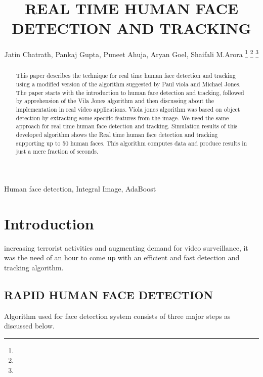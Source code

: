 \documentclass[journal]{IEEEtran}
\begin{document}
\title{REAL TIME HUMAN FACE\\DETECTION AND TRACKING}


\author{Jatin Chatrath,
        Pankaj Gupta,
        Puneet Ahuja,
        Aryan Goel,
        Shaifali M.Arora%
\thanks{}%
\thanks{}%
\thanks{}}



\maketitle

\begin{abstract}
This paper describes the technique for real time human face detection and tracking using a modified version of the algorithm suggested by Paul viola and Michael Jones. The paper starts with the introduction to human face detection and tracking, followed by apprehension of the Vila Jones algorithm and then discussing about the implementation in real video applications. Viola jones algorithm was based on object detection by extracting some specific features from the image. We used the same approach for real time human face detection and tracking. Simulation results of this developed algorithm shows the Real time human face detection and tracking supporting up to 50 human faces. This algorithm computes data and produce results in just a mere fraction of seconds.
\end{abstract}

\begin{IEEEkeywords}
Human face detection, Integral Image, AdaBoost
\end{IEEEkeywords}

\IEEEpeerreviewmaketitle



\section{Introduction}

 increasing terrorist activities and augmenting demand for video surveillance, it was the need of an hour to come up with an efficient and fast detection and tracking algorithm.

\subsection{RAPID HUMAN FACE DETECTION}
Algorithm used for face detection system consists of three major steps as discussed below.
\end{document}
